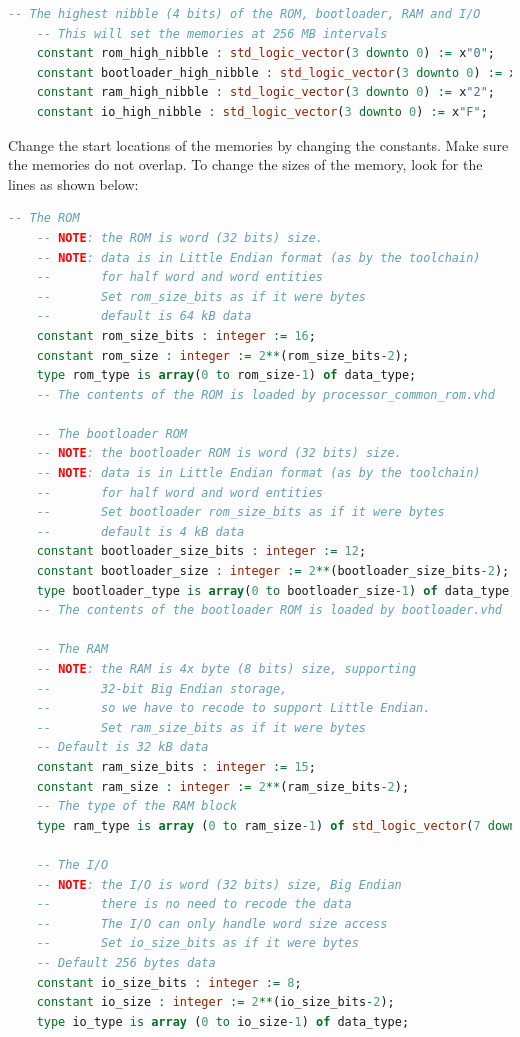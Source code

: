 \documentclass[12pt]{article}
\begin{document}
\begin{lstlisting}[language=VHDL]
    -- The highest nibble (4 bits) of the ROM, bootloader, RAM and I/O
    -- This will set the memories at 256 MB intervals
    constant rom_high_nibble : std_logic_vector(3 downto 0) := x"0";
    constant bootloader_high_nibble : std_logic_vector(3 downto 0) := x"1";
    constant ram_high_nibble : std_logic_vector(3 downto 0) := x"2";
    constant io_high_nibble : std_logic_vector(3 downto 0) := x"F";
\end{lstlisting}

Change the start locations of the memories by changing the constants. Make sure the memories do not overlap. To change the sizes of the memory, look for the lines as shown below:

\begin{lstlisting}[language=VHDL]
    -- The ROM
    -- NOTE: the ROM is word (32 bits) size.
    -- NOTE: data is in Little Endian format (as by the toolchain)
    --       for half word and word entities
    --       Set rom_size_bits as if it were bytes
    --       default is 64 kB data
    constant rom_size_bits : integer := 16;
    constant rom_size : integer := 2**(rom_size_bits-2);
    type rom_type is array(0 to rom_size-1) of data_type;
    -- The contents of the ROM is loaded by processor_common_rom.vhd
    
    -- The bootloader ROM
    -- NOTE: the bootloader ROM is word (32 bits) size.
    -- NOTE: data is in Little Endian format (as by the toolchain)
    --       for half word and word entities
    --       Set bootloader rom_size_bits as if it were bytes
    --       default is 4 kB data
    constant bootloader_size_bits : integer := 12;
    constant bootloader_size : integer := 2**(bootloader_size_bits-2);
    type bootloader_type is array(0 to bootloader_size-1) of data_type;
    -- The contents of the bootloader ROM is loaded by bootloader.vhd
    
    -- The RAM
    -- NOTE: the RAM is 4x byte (8 bits) size, supporting
    --       32-bit Big Endian storage,
    --       so we have to recode to support Little Endian.
    --       Set ram_size_bits as if it were bytes
    -- Default is 32 kB data
    constant ram_size_bits : integer := 15;
    constant ram_size : integer := 2**(ram_size_bits-2);
    -- The type of the RAM block
    type ram_type is array (0 to ram_size-1) of std_logic_vector(7 downto 0);
                        
    -- The I/O
    -- NOTE: the I/O is word (32 bits) size, Big Endian
    --       there is no need to recode the data
    --       The I/O can only handle word size access
    --       Set io_size_bits as if it were bytes
    -- Default 256 bytes data
    constant io_size_bits : integer := 8;
    constant io_size : integer := 2**(io_size_bits-2);
    type io_type is array (0 to io_size-1) of data_type;
\end{lstlisting}
\end{document}
